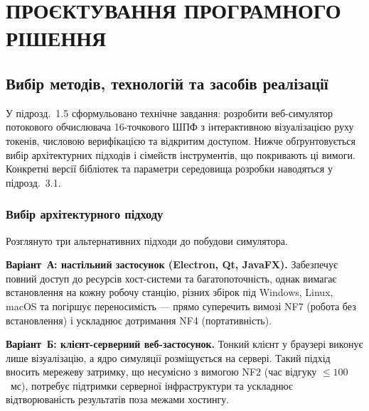 ﻿%
\section{ПРОЄКТУВАННЯ ПРОГРАМНОГО РІШЕННЯ}

%

\subsection{Вибір методів, технологій та засобів реалізації}

У підрозд.~1.5 сформульовано технічне завдання: розробити веб-симулятор
потокового обчислювача 16-точкового ШПФ з інтерактивною візуалізацією
руху токенів, числовою верифікацією та відкритим доступом. Нижче
обґрунтовується вибір архітектурних підходів і сімейств інструментів,
що покривають ці вимоги. Конкретні версії бібліотек та параметри
середовища розробки наводяться у підрозд.~3.1.

\subsubsection*{Вибір архітектурного підходу}

Розглянуто три альтернативних підходи до побудови симулятора.

\textbf{Варіант~А: настільний застосунок (Electron, Qt, JavaFX).}
Забезпечує повний доступ до ресурсів хост-системи та багатопоточність,
однак вимагає встановлення на кожну робочу станцію, різних збірок під
Windows, Linux, macOS та погіршує переносимість --- прямо суперечить
вимозі NF7 (робота без встановлення) і ускладнює дотримання NF4
(портативність).

\textbf{Варіант~Б: клієнт-серверний веб-застосунок.} Тонкий клієнт у
браузері виконує лише візуалізацію, а ядро симуляції розміщується на
сервері. Такий підхід вносить мережеву затримку, що несумісно з
вимогою NF2 (час відгуку $\le 100$~мс), потребує підтримки серверної
інфраструктури та ускладнює відтворюваність результатів поза межами
хостингу.

